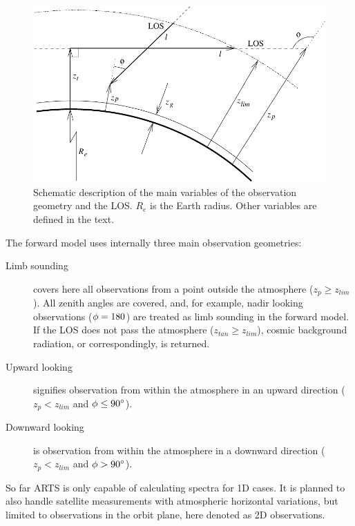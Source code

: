   \begin{figure}[tb]
   \begin{center}
    \includegraphics*[width=0.95\hsize]{Figs/geoms}
    \caption{Schematic description of the main variables of the 
             observation geometry and the LOS. $R_e$ is the Earth
             radius. Other variables are defined in the text.}  
    \label{fig:los1d:geoms}  
   \end{center}
  \end{figure}
  
  The forward model uses internally three main observation geometries:

  \begin{description}
  \item[Limb sounding] covers here all observations from a point
    outside the atmosphere ($z_p \geq z_{lim}$). All zenith angles are
    covered, and, for example, nadir looking observations
    ($\phi=180$) are treated as limb sounding in the forward model.
    If the LOS does not pass the atmosphere ($z_{tan} \geq z_{lim}$),
    cosmic background radiation, or correspondingly, is returned.
  \item[Upward looking] signifies observation from
    within the atmosphere in an upward direction ($z_p<z_{lim}$ and
    $\phi\leq90^{\circ}$). 
  \item[Downward looking] is observation from within the atmosphere in
    a downward direction ($z_p<z_{lim}$ and $\phi>90^{\circ}$).
  \end{description}
 

 \label{sec:los:2d}
 So far ARTS is only capable of calculating spectra for 1D cases.
 It is planned to also handle satellite measurements with atmospheric 
 horizontal variations, but limited to observations in the orbit
 plane, here denoted as 2D observations. 
 
